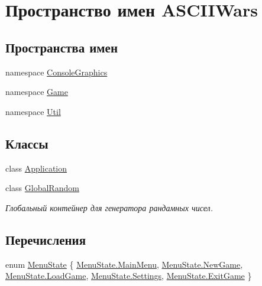 \hypertarget{namespace_a_s_c_i_i_wars}{}\section{Пространство имен A\+S\+C\+I\+I\+Wars}
\label{namespace_a_s_c_i_i_wars}
\subsection*{Пространства имен}
\begin{DoxyCompactItemize}
\item 
namespace \hyperlink{namespace_a_s_c_i_i_wars_1_1_console_graphics}{Console\+Graphics}
\item 
namespace \hyperlink{namespace_a_s_c_i_i_wars_1_1_game}{Game}
\item 
namespace \hyperlink{namespace_a_s_c_i_i_wars_1_1_util}{Util}
\end{DoxyCompactItemize}
\subsection*{Классы}
\begin{DoxyCompactItemize}
\item 
class \hyperlink{class_a_s_c_i_i_wars_1_1_application}{Application}
\item 
class \hyperlink{class_a_s_c_i_i_wars_1_1_global_random}{Global\+Random}
\begin{DoxyCompactList}\small\item\em Глобальный контейнер для генератора рандамных чисел. \end{DoxyCompactList}\end{DoxyCompactItemize}
\subsection*{Перечисления}
\begin{DoxyCompactItemize}
\item 
enum \hyperlink{namespace_a_s_c_i_i_wars_a9b8588e75dba14ac63aa79a49dd5a4eb}{Menu\+State} \{ \newline
\hyperlink{namespace_a_s_c_i_i_wars_a9b8588e75dba14ac63aa79a49dd5a4ebaad1111b48f98329333237912fc3b371b}{Menu\+State.\+Main\+Menu}, 
\hyperlink{namespace_a_s_c_i_i_wars_a9b8588e75dba14ac63aa79a49dd5a4eba31947c4eece1b08b70e9ba88dae24416}{Menu\+State.\+New\+Game}, 
\hyperlink{namespace_a_s_c_i_i_wars_a9b8588e75dba14ac63aa79a49dd5a4eba1613dbfa6c7c385e7aea951a03f93f58}{Menu\+State.\+Load\+Game}, 
\hyperlink{namespace_a_s_c_i_i_wars_a9b8588e75dba14ac63aa79a49dd5a4ebaf4f70727dc34561dfde1a3c529b6205c}{Menu\+State.\+Settings}, 
\newline
\hyperlink{namespace_a_s_c_i_i_wars_a9b8588e75dba14ac63aa79a49dd5a4eba4166c4566d4ee3c335e2f09f7f0d5d0b}{Menu\+State.\+Exit\+Game}
 \}
\end{DoxyCompactItemize}


